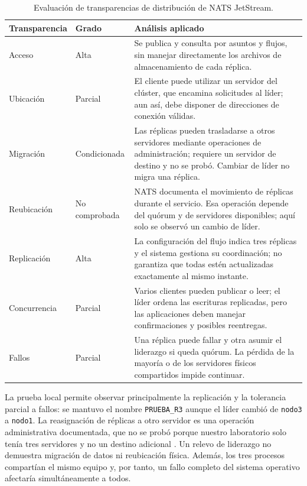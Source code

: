 \documentclass[12pt,a4paper]{article}
\begin{document}
\begingroup
\small
\begin{longtable}{@{}p{2.8cm}p{2.4cm}p{7.9cm}@{}}
\caption{Evaluación de transparencias de distribución de NATS JetStream.}\label{tab:transparencias}\\
\toprule
\textbf{Transparencia} & \textbf{Grado} & \textbf{Análisis aplicado} \\ \midrule
Acceso & Alta & Se publica y consulta por asuntos y flujos, sin manejar directamente los archivos de almacenamiento de cada réplica. \\
Ubicación & Parcial & El cliente puede utilizar un servidor del clúster, que encamina solicitudes al líder; aun así, debe disponer de direcciones de conexión válidas. \\
Migración & Condicionada & Las réplicas pueden trasladarse a otros servidores mediante operaciones de administración; requiere un servidor de destino y no se probó. Cambiar de líder no migra una réplica. \\
Reubicación & No comprobada & NATS documenta el movimiento de réplicas durante el servicio. Esa operación depende del quórum y de servidores disponibles; aquí solo se observó un cambio de líder. \\
Replicación & Alta & La configuración del flujo indica tres réplicas y el sistema gestiona su coordinación; no garantiza que todas estén actualizadas exactamente al mismo instante. \\
Concurrencia & Parcial & Varios clientes pueden publicar o leer; el líder ordena las escrituras replicadas, pero las aplicaciones deben manejar confirmaciones y posibles reentregas. \\
Fallos & Parcial & Una réplica puede fallar y otra asumir el liderazgo si queda quórum. La pérdida de la mayoría o de los servidores físicos compartidos impide continuar. \\ \bottomrule
\end{longtable}
\endgroup

La prueba local permite observar principalmente la replicación y la tolerancia parcial a fallos: se mantuvo el nombre \texttt{PRUEBA\_R3} aunque el líder cambió de \texttt{nodo3} a \texttt{nodo1}. La reasignación de réplicas a otro servidor es una operación administrativa documentada, que no se probó porque nuestro laboratorio solo tenía tres servidores y no un destino adicional \cite{natspeers}. Un relevo de liderazgo no demuestra migración de datos ni reubicación física. Además, los tres procesos compartían el mismo equipo y, por tanto, un fallo completo del sistema operativo afectaría simultáneamente a todos.
\end{document}
